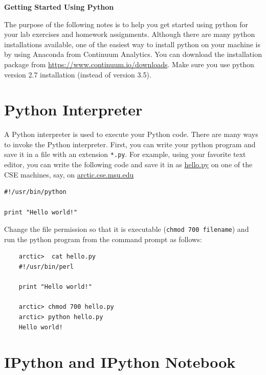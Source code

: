 \documentclass{article}
\begin{document}
\begin{center}
\Large
{\bf Getting Started Using Python}
\normalsize
\end{center}

The purpose of the following notes is to help you get started using python for your lab exercises and homework assignments. Although there are many python installations available, one of the easiest way to install python on your machine is by using Anaconda from Continuum Analytics. You can download the installation package from \url{https://www.continuum.io/downloads}. Make sure you use python version 2.7 installation (instead of version 3.5). 

\section{Python Interpreter}

A Python interpreter is used to execute your Python code. There are many ways to invoke the Python interpreter. First, you can write your python program and save it in a file with an extension \texttt{*.py}. For example, using your favorite text editor, you can write the following code and save it in as \url{hello.py} on one of the CSE machines, say, on \url{arctic.cse.msu.edu}

\begin{verbatim}
#!/usr/bin/python

print "Hello world!"
\end{verbatim}
Change the file permission so that it is executable (\texttt{chmod 700 filename}) and run the python program from the command prompt as follows:
\begin{verbatim}
    arctic>  cat hello.py
    #!/usr/bin/perl
    
    print "Hello world!"
    
    arctic> chmod 700 hello.py
    arctic> python hello.py
    Hello world!
\end{verbatim}

\section{IPython and IPython Notebook}
\end{document}
